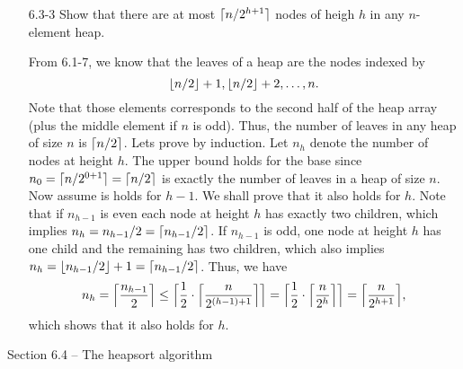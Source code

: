 \begin{enumerate}
\item[6.3-3]{Show that there are at most $\lceil n/2^{h + 1}\rceil$ nodes of heigh $h$
in any $n$-element heap.}

\begin{framed}
From 6.1-7, we know that the leaves of a heap are the nodes indexed by
\[
\lfloor n/2\rfloor + 1, \lfloor n/2\rfloor + 2, \dots, n.
\]
Note that those elements corresponds to the second half of the heap array (plus
the middle element if $n$ is odd). Thus, the number of leaves in any heap of
size $n$ is $\lceil n/2\rceil$. Lets prove by induction. Let $n_h$ denote the number
of nodes at height $h$. The upper bound holds for the base since
$n_0 = \lceil n/2^{0 + 1}\rceil = \lceil n/2\rceil$ is exactly the number of leaves in
a heap of size $n$. Now assume is holds for $h - 1$. We shall prove that it
also holds for $h$.  Note that if $n_{h - 1}$ is even each node at height $h$
has exactly two children, which implies
$n_h = n_{h - 1}/2 = \lceil n_{h - 1}/2\rceil$. If $n_{h - 1}$ is odd, one node at
height $h$ has one child and the remaining has two children, which also implies
$n_h = \lfloor n_{h - 1}/2\rfloor + 1 = \lceil n_{h - 1}/2\rceil$. Thus, we have
\[
  n_h =   \Bigl\lceil \frac{n_{h - 1}}{2} \Bigr\rceil
      \le \Bigl\lceil\frac{1}{2} \cdot \Bigl\lceil\frac{n}{2^{(h - 1) + 1}}\Bigr\rceil\Bigr\rceil
      =   \Bigl\lceil\frac{1}{2} \cdot \Bigl\lceil\frac{n}{2^h}\Bigr\rceil\Bigr\rceil
      =   \Bigl\lceil \frac{n}{2^{h + 1}} \Bigr\rceil,
\]
which shows that it also holds for $h$.
\end{framed}

\end{enumerate}

\newpage

{\large Section 6.4 {--} The heapsort algorithm}

